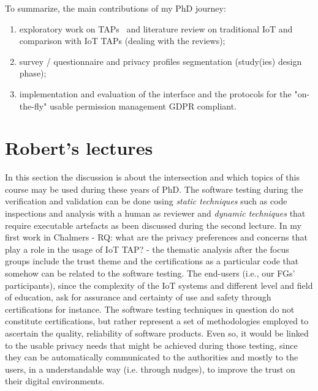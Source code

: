 \documentclass[11pt]{article}
\begin{document}
To summarize, the main contributions of my PhD journey: \begin{enumerate}
    \item exploratory work on TAPs~\cite{romare_2023_tapping} and literature review on traditional IoT and comparison with IoT TAPs (dealing with the reviews);
    \item survey / questionnaire and privacy profiles segmentation (study(ies) design phase);
    \item implementation and evaluation of the interface and the protocols for the "on-the-fly" usable permission management GDPR compliant.
\end{enumerate}

\section{Robert's lectures}\label{sec:2}
In this section the discussion is about the intersection and which topics of this course may be used during these years of PhD. \newline
The software testing during the verification and validation can be done using \textit{static techniques} such as code inspections and analysis with a human as reviewer and \textit{dynamic techniques} that require executable artefacts as been discussed during the second lecture. In my first work in Chalmers - RQ: what are the privacy preferences and concerns that play a role in the usage of IoT TAP? - the thematic analysis after the focus groups include the trust theme and the certifications as a particular code that somehow can be related to the software testing. The end-users (i.e., our FGs' participants), since the complexity of the IoT systems and different level and field of education, ask for assurance and certainty of use and safety through certifications for instance. The software testing techniques in question do not constitute certifications, but rather represent a set of methodologies employed to ascertain the quality, reliability  of software products. Even so, it would be linked to the usable privacy needs that might be achieved during those testing, since they can be automatically communicated to the authorities and mostly to the users, in a understandable way (i.e. through nudges), to improve the trust on their digital environments.
\end{document}
